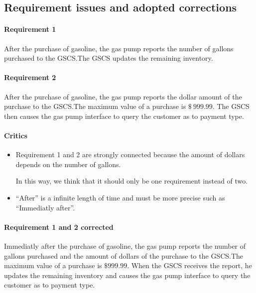 \subsection{Requirement issues and adopted corrections}

\paragraph{Requirement 1} After the purchase of gasoline, the gas pump
reports the number of gallons purchased to the GSCS.\@ The GSCS updates the
remaining inventory.

\paragraph{Requirement 2} After the purchase of gasoline, the gas pump
reports the dollar amount of the purchase to the GSCS.\@ The maximum value of
a purchase is $\$~999.99$. The GSCS then causes the gas pump interface to
query the customer as to payment type.

\begin{framed}
    \paragraph{Critics}
    \begin{itemize}
        \item Requirement 1 and 2 are strongly connected because the
            amount of dollars depends on the number of gallons.

            In this way, we think that it should only be one
            requirement instead of two.

        \item \enquote{After} is a infinite length of time and must be more
            precise such as \enquote{Immediatly after}.
    \end{itemize}

    \paragraph{Requirement 1 and 2 corrected} Immediatly after the purchase of
    gasoline, the gas pump reports the number of gallons purchased and the
    amount of dollars of the purchase to the GSCS.\@ The maximum value of
    a purchase is $\$999.99$.
    When the GSCS receives the report, he updates the remaining
    inventory and causes the gas pump interface to query the customer as to
    payment type.
\end{framed}

